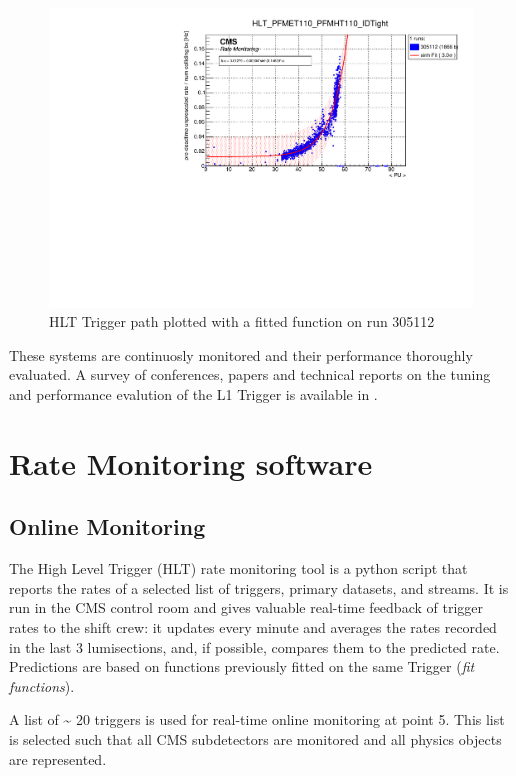 \begin{figure}
    \centerline{
        \includegraphics[width=0.6\paperwidth]{figures/RMT_305112_HLT_PFMET110_PFMHT110_IDTight.pdf}}
    \caption{HLT Trigger path plotted with a fitted function on run 305112}
    \label{fig:ratemon_hlt}
\end{figure}

These systems are continuosly monitored and their performance thoroughly evaluated. A survey of conferences, papers and technical reports on the tuning and performance evalution of the L1 Trigger is available in \cite{L1TriggerDPGResultsCMSPublicTWiki-2020-10-16}.

\section{Rate Monitoring software}

\subsection{Online Monitoring}

The High Level Trigger (HLT) rate monitoring tool is a python script that reports the rates of a selected list of triggers, primary datasets, and streams. It is run in the CMS control room and gives valuable real-time feedback of trigger rates to the shift crew: it updates every minute and averages the rates recorded in the last 3 lumisections, and, if possible, compares them to the predicted rate. Predictions are based on functions previously fitted on the same Trigger (\textit{fit functions}).

A list of \~{} 20 triggers is used for real-time online monitoring at point 5. This list is selected such that all CMS subdetectors are monitored and all physics objects are represented.

